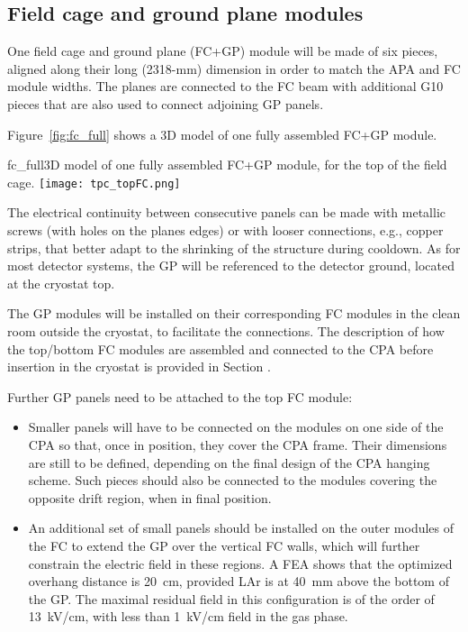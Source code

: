 \subsection{Field cage and ground plane modules}

One field cage and ground plane (FC+GP) module will be made of six pieces, aligned 
along their long (2318-mm) dimension 
 in order to match the APA and FC module widths. The planes are connected to the FC beam with additional 
G10 pieces that are also used to connect adjoining 
GP panels. 

Figure~\ref{fig:fc_full} shows a 3D model of one fully assembled FC+GP module.

\begin{cdrfigure}{fc_full}{3D model of one fully assembled FC+GP module, for the top of the field cage. }
\texttt{[image: tpc\_topFC.png]}
\end{cdrfigure}

The electrical continuity between consecutive panels can be made 
with metallic screws (with holes on the planes edges) or with looser connections, e.g., copper strips, that better adapt to the shrinking of the structure during cooldown. 
As for most detector systems, the GP will %
be referenced to the detector ground, located 
at the cryostat top.

The GP modules  will be installed on their corresponding FC modules in the clean room outside the cryostat, to facilitate the connections. The description of how the top/bottom FC modules are assembled and connected to the CPA before insertion in the cryostat is provided in Section  .

Further GP panels need to be attached to the top FC module:
\begin{itemize}
\item Smaller panels will have to be connected on the modules on one side of the CPA so that, once in position, they 
cover the CPA frame. Their dimensions are 
still to be defined, depending on the final design of the CPA hanging scheme. Such  pieces should also be connected to the modules covering the opposite drift region, when in final position.
\item An additional 
set of small panels should be installed on the outer modules of the FC to extend the GP over the vertical FC walls, which will  
further constrain the electric field in these regions. A FEA 
shows that the optimized overhang distance is 20~cm, provided LAr is at 40~mm above the bottom of the GP. The maximal residual field in this configuration is of the order of 13~kV/cm, with less than 1~kV/cm field in the gas phase.
\end{itemize}

